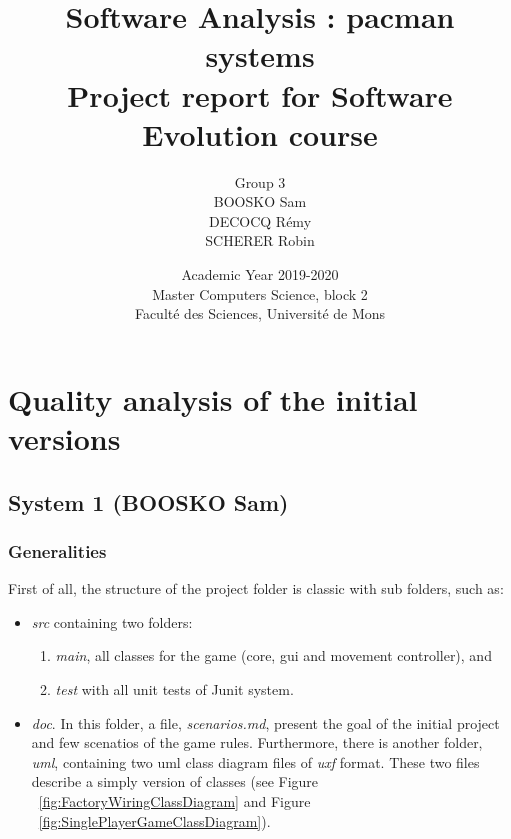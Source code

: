 \documentclass[]{article}
\begin{document}
\title{
\vspace{1.6cm}
{\Huge Software Analysis : pacman systems}\\
\vspace{0.5cm}
{\Huge Project report for Software Evolution course}\vspace{1cm}\\
}


\author{
\vspace{1cm}
\huge{Group 3}\\
\Large{BOOSKO Sam}\\
\Large{DECOCQ Rémy}\\
\Large{SCHERER Robin}
}


\date{
\vspace{7.9cm}
Academic Year 2019-2020\\
Master Computers Science, block 2\\
Faculté des Sciences, Université de Mons}

\maketitle          

\thispagestyle{empty}   

\newpage

\tableofcontents
\newpage

\section{Quality analysis of the initial versions}
\subsection{System 1 (BOOSKO Sam)}
\subsubsection{Generalities}

First of all, the structure of the project folder is classic with sub folders, such as:
\begin{itemize}
    \item \textit{src} containing two folders:
    \begin{enumerate}
        \item \textit{main}, all classes for the game (core, gui and movement controller), and
        \item \textit{test} with all unit tests of Junit system.
    \end{enumerate}
    \item \textit{doc}. In this folder, a file, \textit{scenarios.md}, present the goal of the initial project and few scenatios of the game rules. Furthermore, there is another folder, \textit{uml}, containing two uml class diagram files of \textit{uxf} format. These two files describe a simply version of classes (see Figure ~\ref{fig:FactoryWiringClassDiagram} and Figure ~\ref{fig:SinglePlayerGameClassDiagram}).
\end{itemize}
\end{document}
